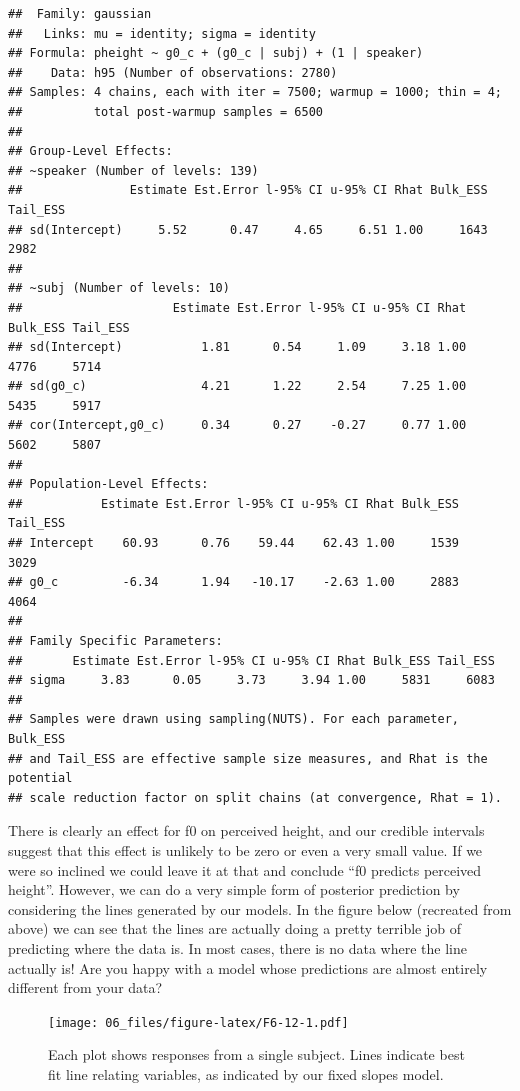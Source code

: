 \documentclass[
]{book}
\begin{document}
\begin{verbatim}
##  Family: gaussian 
##   Links: mu = identity; sigma = identity 
## Formula: pheight ~ g0_c + (g0_c | subj) + (1 | speaker) 
##    Data: h95 (Number of observations: 2780) 
## Samples: 4 chains, each with iter = 7500; warmup = 1000; thin = 4;
##          total post-warmup samples = 6500
## 
## Group-Level Effects: 
## ~speaker (Number of levels: 139) 
##               Estimate Est.Error l-95% CI u-95% CI Rhat Bulk_ESS Tail_ESS
## sd(Intercept)     5.52      0.47     4.65     6.51 1.00     1643     2982
## 
## ~subj (Number of levels: 10) 
##                     Estimate Est.Error l-95% CI u-95% CI Rhat Bulk_ESS Tail_ESS
## sd(Intercept)           1.81      0.54     1.09     3.18 1.00     4776     5714
## sd(g0_c)                4.21      1.22     2.54     7.25 1.00     5435     5917
## cor(Intercept,g0_c)     0.34      0.27    -0.27     0.77 1.00     5602     5807
## 
## Population-Level Effects: 
##           Estimate Est.Error l-95% CI u-95% CI Rhat Bulk_ESS Tail_ESS
## Intercept    60.93      0.76    59.44    62.43 1.00     1539     3029
## g0_c         -6.34      1.94   -10.17    -2.63 1.00     2883     4064
## 
## Family Specific Parameters: 
##       Estimate Est.Error l-95% CI u-95% CI Rhat Bulk_ESS Tail_ESS
## sigma     3.83      0.05     3.73     3.94 1.00     5831     6083
## 
## Samples were drawn using sampling(NUTS). For each parameter, Bulk_ESS
## and Tail_ESS are effective sample size measures, and Rhat is the potential
## scale reduction factor on split chains (at convergence, Rhat = 1).
\end{verbatim}

There is clearly an effect for f0 on perceived height, and our credible intervals suggest that this effect is unlikely to be zero or even a very small value. If we were so inclined we could leave it at that and conclude ``f0 predicts perceived height''. However, we can do a very simple form of posterior prediction by considering the lines generated by our models. In the figure below (recreated from above) we can see that the lines are actually doing a pretty terrible job of predicting where the data is. In most cases, there is no data where the line actually is! Are you happy with a model whose predictions are almost entirely different from your data?

\begin{figure}
\centering
\texttt{[image: 06\_files/figure-latex/F6-12-1.pdf]}
\caption{\label{fig:F6-12}Each plot shows responses from a single subject. Lines indicate best fit line relating variables, as indicated by our fixed slopes model.}
\end{figure}
\end{document}
